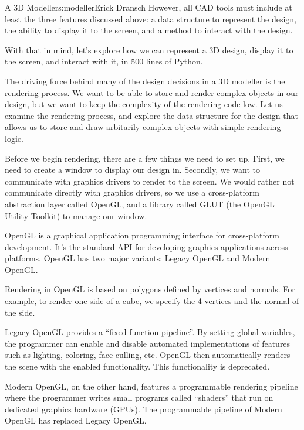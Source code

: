 \begin{aosachapter}{A 3D Modeller}{s:modeller}{Erick Dransch}
However, all CAD tools must include at least the three features
discussed above: a data structure to represent the design, the ability
to display it to the screen, and a method to interact with the design.

With that in mind, let's explore how we can represent a 3D design,
display it to the screen, and interact with it, in 500 lines of Python.

\label{rendering-as-a-guide}

The driving force behind many of the design decisions in a 3D modeller
is the rendering process. We want to be able to store and render complex
objects in our design, but we want to keep the complexity of the
rendering code low. Let us examine the rendering process, and explore
the data structure for the design that allows us to store and draw
arbitarily complex objects with simple rendering logic.

\label{managing-interfaces-and-the-main-loop}

Before we begin rendering, there are a few things we need to set up.
First, we need to create a window to display our design in. Secondly, we
want to communicate with graphics drivers to render to the screen. We
would rather not communicate directly with graphics drivers, so we use a
cross-platform abstraction layer called OpenGL, and a library called
GLUT (the OpenGL Utility Toolkit) to manage our window.

\label{a-note-about-opengl}

OpenGL is a graphical application programming interface for
cross-platform development. It's the standard API for developing
graphics applications across platforms. OpenGL has two major variants:
Legacy OpenGL and Modern OpenGL.

Rendering in OpenGL is based on polygons defined by vertices and
normals. For example, to render one side of a cube, we specify the 4
vertices and the normal of the side.

Legacy OpenGL provides a ``fixed function pipeline''. By setting global
variables, the programmer can enable and disable automated
implementations of features such as lighting, coloring, face culling,
etc. OpenGL then automatically renders the scene with the enabled
functionality. This functionality is deprecated.

Modern OpenGL, on the other hand, features a programmable rendering
pipeline where the programmer writes small programs called ``shaders''
that run on dedicated graphics hardware (GPUs). The programmable
pipeline of Modern OpenGL has replaced Legacy OpenGL.


\end{aosachapter}
